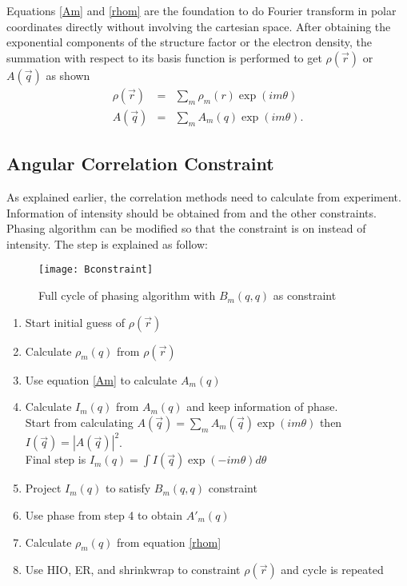 Equations \ref{Am} and \ref{rhom} are the foundation to do Fourier transform in polar coordinates directly without involving the cartesian space. After obtaining the exponential components of the structure factor or the electron density, the summation with respect to its basis function is performed to get $\rho(\vec{r})$ or $A(\vec{q})$ as shown
\begin{eqnarray}
\label{rho_aq}
\rho(\vec{r})&=&\sum_{m} \rho_{m}(r) \exp(i m \theta)  \\
A(\vec{q})&=&\sum_{m} A_{m}(q) \exp(i m \theta). \nonumber 
\end{eqnarray}

\subsection{Angular Correlation Constraint}
As explained earlier, the correlation methods need to calculate \Bmq from experiment. Information of intensity should be obtained from \Bmq and the other constraints. Phasing algorithm can be modified so that the constraint is on \Bmq instead of intensity\cite{Donatelli}. The step is explained as follow:
\begin{figure}[ht]
  \centering
  \texttt{[image: Bconstraint]}
\caption{Full cycle of phasing algorithm with $B_{m}(q,q)$ as constraint}
\label{fig:Bconstraint}
\end{figure}
\begin{enumerate}
  \item Start initial guess of $\rho(\vec{r})$
  \item Calculate $\rho_{m}(q)$ from $\rho(\vec{r})$
  \item Use equation \ref{Am} to calculate $A_{m}(q)$
  \item Calculate $I_{m}(q)$ from $A_{m}(q)$ and keep information of phase. \\
    Start from calculating $A(\vec{q})=\sum_{m} A_{m}(\vec{q}) \exp(i m \theta)$ then $I(\vec{q})=|A(\vec{q})|^{2}$. \\
    Final step is $I_{m}(q)=\int I(\vec{q}) \exp(-i m \theta) d\theta $ 
  \item Project $I_{m}(q)$ to satisfy $B_{m}(q,q)$ constraint
  \item Use phase from step 4 to obtain $A'_{m}(q)$ 
  \item Calculate $\rho_{m}(q)$ from equation \ref{rhom}
  \item Use HIO, ER, and shrinkwrap to constraint $\rho(\vec{r})$ and cycle is repeated
\end{enumerate}
